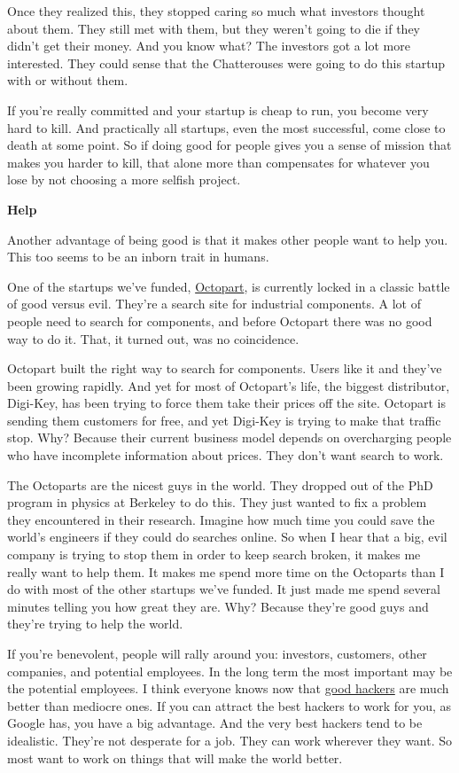Once they realized this, they stopped caring so much what investors
thought about them. They still met with them, but they weren't going to
die if they didn't get their money. And you know what? The investors got
a lot more interested. They could sense that the Chatterouses were going
to do this startup with or without them.

If you're really committed and your startup is cheap to run, you become
very hard to kill. And practically all startups, even the most
successful, come close to death at some point. So if doing good for
people gives you a sense of mission that makes you harder to kill, that
alone more than compensates for whatever you lose by not choosing a more
selfish project.

\textbf{Help}

Another advantage of being good is that it makes other people want to
help you. This too seems to be an inborn trait in humans.

One of the startups we've funded, \href{http://octopart.com}{Octopart},
is currently locked in a classic battle of good versus evil. They're a
search site for industrial components. A lot of people need to search
for components, and before Octopart there was no good way to do it.
That, it turned out, was no coincidence.

Octopart built the right way to search for components. Users like it and
they've been growing rapidly. And yet for most of Octopart's life, the
biggest distributor, Digi-Key, has been trying to force them take their
prices off the site. Octopart is sending them customers for free, and
yet Digi-Key is trying to make that traffic stop. Why? Because their
current business model depends on overcharging people who have
incomplete information about prices. They don't want search to work.

The Octoparts are the nicest guys in the world. They dropped out of the
PhD program in physics at Berkeley to do this. They just wanted to fix a
problem they encountered in their research. Imagine how much time you
could save the world's engineers if they could do searches online. So
when I hear that a big, evil company is trying to stop them in order to
keep search broken, it makes me really want to help them. It makes me
spend more time on the Octoparts than I do with most of the other
startups we've funded. It just made me spend several minutes telling you
how great they are. Why? Because they're good guys and they're trying to
help the world.

If you're benevolent, people will rally around you: investors,
customers, other companies, and potential employees. In the long term
the most important may be the potential employees. I think everyone
knows now that \href{gh.html}{good hackers} are much better than
mediocre ones. If you can attract the best hackers to work for you, as
Google has, you have a big advantage. And the very best hackers tend to
be idealistic. They're not desperate for a job. They can work wherever
they want. So most want to work on things that will make the world
better.

